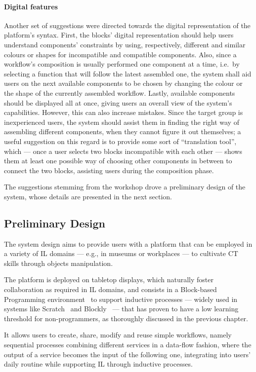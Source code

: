 \paragraph{Digital features} Another set of suggestions were directed towards the digital representation of the platform's syntax. First, the blocks' digital representation should help users understand components' constraints by using, respectively, different and similar colours or shapes for incompatible and compatible components. Also, since a workflow's composition is usually performed one component at a time, i.e.\ by selecting a function that will follow the latest assembled one, the system shall aid users on the next available components to be chosen by changing the colour or the shape of the currently assembled workflow. Lastly, available components should be displayed all at once, giving users an overall view of the system's capabilities. However, this can also increase mistakes. Since the target group is inexperienced users, the system should assist them in finding the right way of assembling different components, when they cannot figure it out themselves; a useful suggestion on this regard is to provide some sort of ``translation tool'', which --- once a user selects two blocks incompatible with each other --- shows them at least one possible way of choosing other components in between to connect the two blocks, assisting users during the composition phase.

The suggestions stemming from the workshop drove a preliminary design of the system, whose details are presented in the next section.

\subsection{Preliminary Design}\label{sec:pdesign}
The system design aims to provide users with a platform that can be employed in a variety of \ac{IL} domains --- e.g., in museums or workplaces --- to cultivate \ac{CT} skills through objects manipulation.

The platform is deployed on tabletop displays, which naturally foster collaboration as required in \ac{IL} domains, and consists in a Block-based Programming environment~\cite{Mohamad:2011kz} to support inductive processes --- widely used in systems like Scratch~\cite{Resnick:2009bd} and Blockly~\cite{BLOCKLY} --- that has proven to have a low learning threshold for non-programmers, as thoroughly discussed in the previous chapter.

It allows users to create, share, modify and reuse simple workflows, namely sequential processes combining different services in a data-flow fashion, where the output of a service becomes the input of the following one, integrating into users' daily routine while supporting \ac{IL} through inductive processes. 

